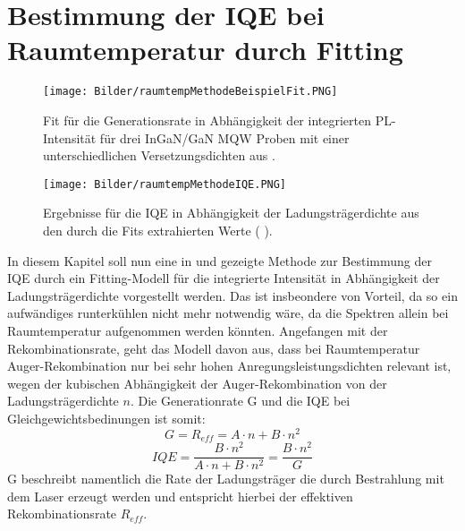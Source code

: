 
\section{Bestimmung der IQE bei Raumtemperatur durch Fitting}

\thispagestyle{fancy}

\begin{figure}[htb]
    \centering
    \begin{minipage}[t]{0.49\linewidth}
        \centering
        \texttt{[image: Bilder/raumtempMethodeBeispielFit.PNG]}
        \caption{Fit für die Generationsrate in Abhängigkeit der integrierten PL-Intensität für drei InGaN/GaN MQW Proben mit einer unterschiedlichen Versetzungsdichten aus \cite{doi:10.1063/1.3100773}.}
    \end{minipage}%
    \hfill
    \begin{minipage}[t]{0.49\linewidth}
        \centering
        \texttt{[image: Bilder/raumtempMethodeIQE.PNG]}
        \caption{Ergebnisse für die IQE in Abhängigkeit der Ladungsträgerdichte aus den durch die Fits extrahierten Werte ( \cite{doi:10.1063/1.3100773}). }
        \label{fig:iqert}
    \end{minipage}
\end{figure}
\noindent
In diesem Kapitel soll nun eine in \cite{doi:10.1063/1.3100773} und \cite{doi:10.1063/1.4917540} gezeigte Methode zur Bestimmung der IQE durch ein Fitting-Modell für die integrierte Intensität in Abhängigkeit der Ladungsträgerdichte vorgestellt werden. Das ist insbeondere von Vorteil, da so ein aufwändiges runterkühlen nicht mehr notwendig wäre, da die Spektren allein bei Raumtemperatur aufgenommen werden könnten. 
\newline
Angefangen mit der Rekombinationsrate, geht das Modell davon aus,
dass bei Raumtemperatur Auger-Rekombination nur bei sehr hohen Anregungsleistungsdichten relevant ist, wegen der kubischen Abhängigkeit der Auger-Rekombination von der Ladungsträgerdichte $n$. Die Generationrate G und die IQE bei Gleichgewichtsbedinungen ist somit:
\begin{equation}
    G = R_{eff} = A \cdot n + B \cdot n^2
    \label{eq:generationrate}
\end{equation}  
\begin{equation}
    IQE = \frac{B\cdot n^2}{A \cdot n + B \cdot n^2} = \frac{B\cdot n^2}{G}
    \label{eq:iqe2}
\end{equation}  
G beschreibt namentlich die Rate der Ladungsträger die durch Bestrahlung mit dem Laser erzeugt werden und entspricht hierbei der effektiven Rekombinationsrate $R_{eff}$.
